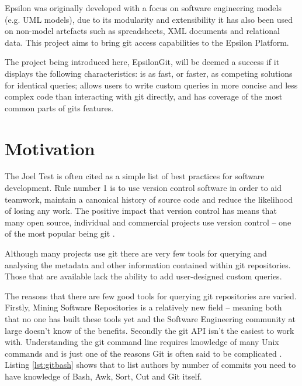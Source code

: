 \documentclass[11pt]{book}
\begin{document}
Epsilon was originally developed with a focus on software engineering models (e.g. UML models), due to its modularity and extensibility it has also been used on non-model artefacts such as spreadsheets, XML documents and relational data. This project aims to bring git access capabilities to the Epsilon Platform.

The project being introduced here, EpsilonGit, will be deemed a success if it displays the following characteristics: is as fast, or faster, as competing solutions for identical queries; allows users to write custom queries in more concise and less complex code than interacting with git directly, and has coverage of the most common parts of gits features.

\section{Motivation}
The Joel Test \cite{joeltest} is often cited as a simple list of best practices for software development. Rule number 1 is to use version control software in order to aid teamwork, maintain a canonical history of source code and reduce the likelihood of losing any work. The positive impact that version control has means that many open source, individual and commercial projects use version control -- one of the most popular being git \cite{gitpopularity}. 

Although many projects use git there are very few tools for querying and analysing the metadata and other information contained within git repositories. Those that are available lack the ability to add user-designed custom queries. 

The reasons that there are few good tools for querying git repositories are varied. Firstly, Mining Software Repositories is a relatively new field --  meaning both that no one has built these tools yet and the Software Engineering community at large doesn't know of the benefits. Secondly the git API isn't the easiest to work with. Understanding the git command line requires knowledge of many Unix commands and is just one of the reasons Git is often said to be complicated \cite{gitcomplex}\cite{githard}\cite{gitmixedmetaphors}. Listing \ref{lst:gitbash} shows that to list authors by number of commits you need to have knowledge of Bash, Awk, Sort, Cut and Git itself.\\ 
\end{document}
